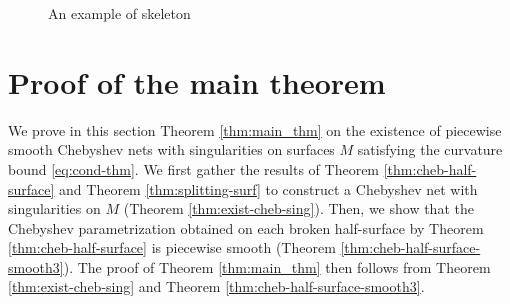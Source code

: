\documentclass{article}
\newcommand{\R}{\mathbb{R}}
\newcommand{\surf}{M}
\newcommand{\HalfP}{S}
\newcommand{\halfP}{B}
\newcommand{\Nver}{\mathcal{N}_{\mathrm{ver}}}
\newcommand{\Npol}{\mathcal{N}_{\mathrm{pol}}}
\theoremstyle{remark}
\theoremstyle{prpart}
\begin{document}
\begin{figure}[!htp]
  \caption{An example of skeleton}  \label{fig:skeleton}
\end{figure}

\section{Proof of the main theorem}\label{subsec:cheb-net-sing}
We prove in this section Theorem \ref{thm:main_thm} on the existence of piecewise smooth Chebyshev nets with singularities on surfaces $\surf$ satisfying the curvature bound \eqref{eq:cond-thm}.
We first gather the results of Theorem  \ref{thm:cheb-half-surface} and Theorem \ref{thm:splitting-surf} to construct a Chebyshev net with singularities on $\surf$ (Theorem \ref{thm:exist-cheb-sing}). Then, we show that the Chebyshev parametrization obtained on each broken half-surface by Theorem \ref{thm:cheb-half-surface} is piecewise smooth (Theorem \ref{thm:cheb-half-surface-smooth3}). The proof of Theorem \ref{thm:main_thm} then follows from Theorem \ref{thm:exist-cheb-sing} and Theorem \ref{thm:cheb-half-surface-smooth3}.
\end{document}
